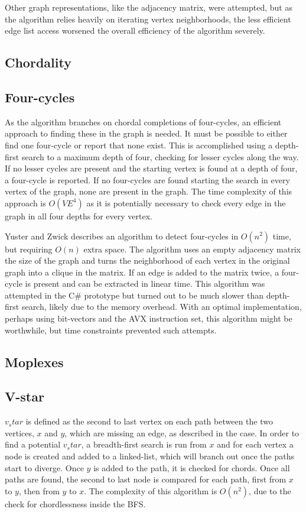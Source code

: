 \documentclass{article}
\begin{document}
		Other graph representations, like the adjacency matrix, were attempted, but as the algorithm relies heavily on iterating vertex neighborhoods, the less efficient edge list access worsened the overall efficiency of the algorithm severely.

		\subsection{Chordality}

		\subsection{Four-cycles}
		As the algorithm branches on chordal completions of four-cycles, an efficient approach to finding these in the graph is needed.
		It must be possible to either find one four-cycle or report that none exist.
		This is accomplished using a depth-first search to a maximum depth of four, checking for lesser cycles along the way.
		If no lesser cycles are present and the starting vertex is found at a depth of four, a four-cycle is reported.
		If no four-cycles are found starting the search in every vertex of the graph, none are present in the graph.
		The time complexity of this approach is $O(VE^4)$ as it is potentially necessary to check every edge in the graph in all four depths for every vertex.

		Yuster and Zwick\cite{finding-even-cycles} describes an algorithm to detect four-cycles in $O(n^2)$ time, but requiring $O(n)$ extra space.
		The algorithm uses an empty adjacency matrix the size of the graph and turns the neighborhood of each vertex in the original graph into a clique in the matrix.
		If an edge is added to the matrix twice, a four-cycle is present and can be extracted in linear time.
		This algorithm was attempted in the C\# prototype but turned out to be much slower than depth-first search, likely due to the memory overhead.
		With an optimal implementation, perhaps using bit-vectors and the AVX instruction set, this algorithm might be worthwhile, but time constraints prevented such attempts.

		\subsection{Moplexes}

		\subsection{V-star}
		$v_star$ is defined as the second to last vertex on each path between the two vertices, $x$ and $y$, which are missing an edge, as described in the case.
		In order to find a potential $v_star$, a breadth-first search is run from $x$ and for each vertex a node is created and added to a linked-list, which will branch out once the paths start to diverge.
		Once $y$ is added to the path, it is checked for chords.
		Once all paths are found, the second to last node is compared for each path, first from $x$ to $y$, then from $y$ to $x$.
		The complexity of this algorithm is $O(n^2)$, due to the check for chordlessness inside the BFS.
\end{document}
